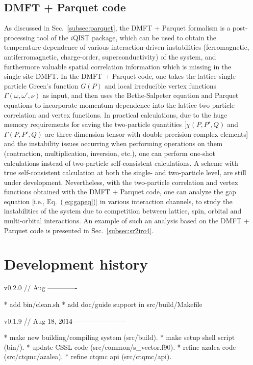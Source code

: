 \subsection{DMFT + Parquet code\label{subsec:parquet code}}
As discussed in Sec.~\ref{subsec:parquet}, the DMFT + Parquet formalism is a post-processing tool of the $i$QIST package, which can be used to obtain the temperature dependence of various interaction-driven instabilities (ferromagnetic, antiferromagnetic, charge-order, superconductivity) of the system, and furthermore valuable spatial correlation information which is missing in the single-site DMFT. In the DMFT + Parquet code, one takes the lattice single-particle Green's function $G(P)$ and local irreducible vertex functions $\Gamma(\omega,\omega',\nu)$ as input, and then uses the Bethe-Salpeter equation and Parquet equations to incorporate momentum-dependence into the lattice two-particle correlation and vertex functions. In practical calculations, due to the huge memory requirements for saving the two-particle quantities [$\chi(P,P',Q)$ and $\Gamma(P,P',Q)$ are three-dimension tensor with double precision complex elements] and the instability issues occurring when performing operations on them (contraction, multiplication, inversion, etc.), one can perform one-shot calculations instead of two-particle self-consistent calculations. A scheme with true self-consistent calculation at both the single- and two-particle level, are still under development. Nevertheless, with the two-particle correlation and vertex functions obtained with the DMFT + Parquet code, one can  analyze the gap equation [i.e., Eq.~(\ref{eq:gapeq})] in various interaction channels, to study the instabilities of the system due to competition between lattice, spin, orbital and multi-orbital interactions. An example of such an analysis based on the DMFT + Parquet code is presented in Sec.~\ref{subsec:sr2iro4}. 


\section{Development history}

v0.2.0 // Aug
-------------

* add bin/clean.sh
* add doc/guide support in src/build/Makefile


v0.1.9 // Aug 18, 2014
----------------------

* make new building/compiling system (src/build).
* make setup shell script (bin/).
* update CSSL code (src/common/s\_vector.f90).
* refine azalea code (src/ctqmc/azalea).
* refine ctqmc api (src/ctqmc/api).


